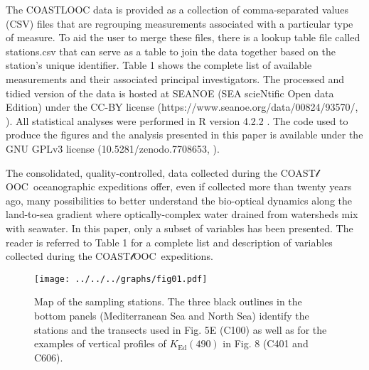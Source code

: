 \documentclass[essd, manuscript]{copernicus}
\newcommand{\coastlooc}{COAST$\mathscr{l}$OOC~\allowbreak}
\begin{document}
The COASTLOOC data is provided as a collection of comma-separated values (CSV) files that are regrouping measurements associated with a particular type of measure. To aid the user to merge these files, there is a lookup table file called stations.csv that can serve as a table to join the data together based on the station's unique identifier. Table 1 shows the complete list of available measurements and their associated principal investigators. The processed and tidied version of the data is hosted at SEANOE (SEA scieNtific Open data Edition) under the CC-BY license (https://www.seanoe.org/data/00824/93570/, \citealt{Massicotte2023a}). All statistical analyses were performed in R version 4.2.2 \citep{RCoreTeam2022}. The code used to produce the figures and the analysis presented in this paper is available under the GNU GPLv3 license (10.5281/zenodo.7708653, \citealt{Massicotte2023}).

\conclusions  %

The consolidated, quality-controlled, data collected during the \coastlooc oceanographic expeditions offer, even if collected more than twenty years ago, many possibilities to better understand the bio-optical dynamics along the land-to-sea gradient where optically-complex water drained from watersheds mix with seawater. In this paper, only a subset of variables has been presented. The reader is referred to Table 1 for a complete list and description of variables collected during the \coastlooc expeditions.






\begin{figure}[t]
    \texttt{[image: ../../../graphs/fig01.pdf]}
    \caption{Map of the sampling stations. The three black outlines in the bottom panels (Mediterranean Sea and North Sea) identify the stations and the transects used in Fig. 5E (C100) as well as for the examples of vertical profiles of $K_{\text{Ed}}(490)$ in Fig. 8 (C401 and C606).}
\end{figure}
\end{document}
